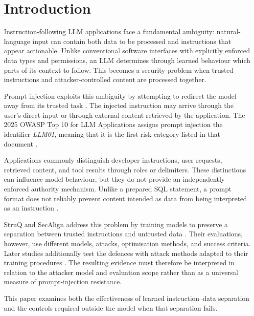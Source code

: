 \section{Introduction}
\label{sec:einleitung}

Instruction-following LLM applications face a fundamental ambiguity:
natural-language input can contain both data to be processed and instructions
that appear actionable. Unlike conventional software interfaces with explicitly
enforced data types and permissions, an LLM determines through learned
behaviour which parts of its context to follow. This becomes a security problem
when trusted instructions and attacker-controlled content are processed
together.

Prompt injection exploits this ambiguity by attempting to redirect the model
away from its trusted task
\parencites{perez2022ignore}{greshake2023indirect}. The injected instruction may
arrive through the user's direct input or through external content retrieved by
the application. The 2025 OWASP Top 10 for LLM Applications assigns prompt
injection the identifier \emph{LLM01}, meaning that it is the first risk
category listed in that document
\parencite{owasp2025llm}.

Applications commonly distinguish developer instructions, user requests,
retrieved content, and tool results through roles or delimiters. These
distinctions can influence model behaviour, but they do not provide an
independently enforced authority mechanism. Unlike a prepared SQL statement, a
prompt format does not reliably prevent content intended as data from being
interpreted as an instruction
\parencites{liu2023promptinjection}{wallace2024instruction}.

StruQ and SecAlign address this problem by training models to preserve a
separation between trusted instructions and untrusted data
\parencites{chen2025struq}{chen2025secalign}. Their evaluations, however, use
different models, attacks, optimisation methods, and success criteria. Later
studies additionally test the defences with attack methods adapted to their
training procedures
\parencites{jia2025critical}
             {yang2025checkpointgcg}
             {pandya2025astra}. The resulting evidence must therefore be
interpreted in relation to the attacker model and evaluation scope rather than
as a universal measure of prompt-injection resistance.

This paper examines both the effectiveness of learned instruction--data
separation and the controls required outside the model when that separation
fails.

